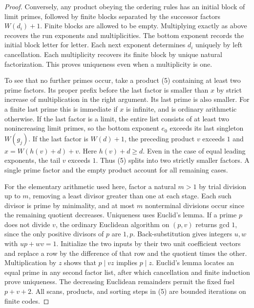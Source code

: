 \begin{proof}
Conversely, any product obeying the ordering rules has an initial
block of limit primes, followed by finite blocks separated by the
successor factors $W(d_i)+1$. Finite blocks are allowed to be empty.
Multiplying exactly as above recovers the run exponents and
multiplicities. The bottom exponent records the initial block
letter for letter. Each next exponent determines $d_i$ uniquely by
left cancellation. Each multiplicity recovers its finite block by
unique natural factorization. This proves uniqueness even when a
multiplicity is one.

To see that no further primes occur, take a product (5) containing at
least two prime factors. Its proper prefix before the last factor is
smaller than $x$ by strict increase of multiplication in the right
argument. Its last prime is also smaller. For a finite last prime this
is immediate if $x$ is infinite, and is ordinary arithmetic otherwise.
If the last factor is a limit, the entire list consists of at least two
nonincreasing limit primes, so the bottom exponent $e_0$ exceeds its
last singleton $W(g_j)$. If the last factor is $W(d)+1$, the preceding
product $v$ exceeds $1$ and $x=W(h(v)+d)+v$. Here $h(v)+d\ge d$. Even in the case of equal leading exponents, the tail $v$ exceeds $1$.
Thus (5) splits into two strictly smaller factors. A single prime
factor and the empty product account for all remaining cases.

For the elementary arithmetic used here, factor a natural $m>1$ by
trial division up to $m$, removing a least divisor greater than one
at each stage. Each such divisor is prime by minimality, and at most
$m$ nonterminal divisions occur since the remaining quotient decreases.
Uniqueness uses Euclid's lemma. If a prime $p$ does not divide $v$, the
ordinary Euclidean algorithm on $(p,v)$ returns gcd $1$, since the only
positive divisors of $p$ are $1,p$. Back-substitution gives integers
$u,w$ with $up+wv=1$. Initialize the two inputs by their two unit
coefficient vectors and replace a row by the difference of that row
and the quotient times the other. Multiplication by $z$ shows that
$p\mid vz$ implies $p\mid z$. Euclid's lemma locates an equal prime
in any second factor list, after which cancellation and finite induction
prove uniqueness. The decreasing Euclidean remainders permit the fixed
fuel $p+v+2$. All scans, products, and sorting steps in (5) are bounded
iterations on finite codes.
\end{proof}
